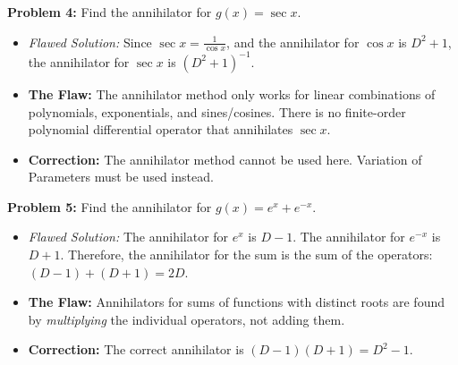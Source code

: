 \documentclass[11pt, a4paper]{article}
\theoremstyle{definition}
\theoremstyle{remark}
\begin{document}
\vspace{1em}
\textbf{Problem 4:} Find the annihilator for $g(x) = \sec x$.
\begin{itemize}
    \item \textit{Flawed Solution:} Since $\sec x = \frac{1}{\cos x}$, and the annihilator for $\cos x$ is $D^2 + 1$, the annihilator for $\sec x$ is $(D^2 + 1)^{-1}$.
    \item \textbf{The Flaw:} The annihilator method only works for linear combinations of polynomials, exponentials, and sines/cosines. There is no finite-order polynomial differential operator that annihilates $\sec x$.
    \item \textbf{Correction:} The annihilator method cannot be used here. Variation of Parameters must be used instead.
\end{itemize}

\vspace{1em}
\textbf{Problem 5:} Find the annihilator for $g(x) = e^x + e^{-x}$.
\begin{itemize}
    \item \textit{Flawed Solution:} The annihilator for $e^x$ is $D-1$. The annihilator for $e^{-x}$ is $D+1$. Therefore, the annihilator for the sum is the sum of the operators: $(D-1) + (D+1) = 2D$.
    \item \textbf{The Flaw:} Annihilators for sums of functions with distinct roots are found by \textit{multiplying} the individual operators, not adding them.
    \item \textbf{Correction:} The correct annihilator is $(D-1)(D+1) = D^2 - 1$.
\end{itemize}
\end{document}
